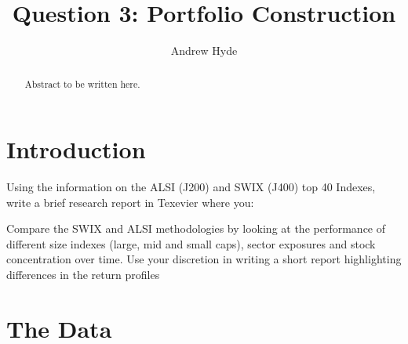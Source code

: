 \documentclass[11pt,preprint, authoryear]{elsarticle}
\numberwithin{equation}{section}
\numberwithin{figure}{section}
\numberwithin{table}{section}
\begin{document}
\begin{frontmatter}  %

\title{Question 3: Portfolio Construction}





\author[Add1]{Andrew Hyde}
\ead{}







\begin{abstract}
\small{
Abstract to be written here.
}
\end{abstract}

\vspace{1cm}





\vspace{0.5cm}

\end{frontmatter}



\pagestyle{fancy}
\chead{}
\rhead{}
\lfoot{}
\lhead{}
\cfoot{}


\headsep 35pt %




\hypertarget{introduction}{%
\section{\texorpdfstring{Introduction
\label{Introduction}}{Introduction }}\label{introduction}}

Using the information on the ALSI (J200) and SWIX (J400) top 40 Indexes,
write a brief research report in Texevier where you:

Compare the SWIX and ALSI methodologies by looking at the performance of
different size indexes (large, mid and small caps), sector exposures and
stock concentration over time. Use your discretion in writing a short
report highlighting differences in the return profiles

\hypertarget{the-data}{%
\section{The Data}\label{the-data}}
\end{document}
